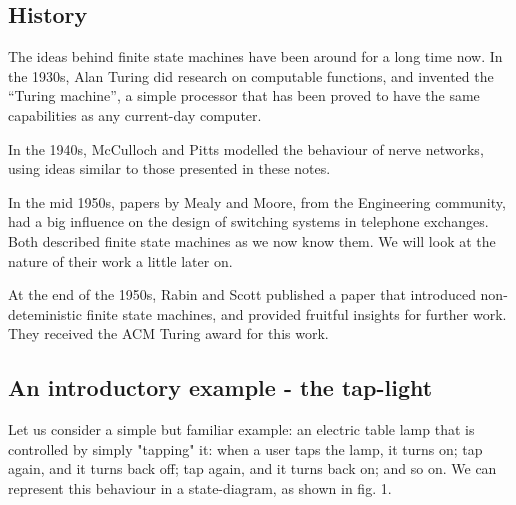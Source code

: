 \documentclass{article}
\begin{document}
\subsection*{History}

The ideas behind finite state machines have been around for a long time now. In the 1930s, Alan Turing did research on computable functions, and invented the “Turing machine”, a simple processor that has been proved to have the same capabilities as any current-day computer.

In the 1940s, McCulloch and Pitts modelled the behaviour of nerve networks, using ideas similar to those presented in these notes.

In the mid 1950s, papers by Mealy and Moore, from the Engineering community, had a big influence on the design of switching systems in telephone exchanges. Both described finite state machines as we now know them. We will look at the nature of their work a little later on.

At the end of the 1950s, Rabin and Scott published a paper that introduced non-deteministic finite state machines, and provided fruitful insights for further work. They received the ACM Turing award for this work.

\subsection*{An introductory example - the tap-light}

Let us consider a simple but familiar example: an electric table lamp that is controlled by simply "tapping" it: when a user taps the lamp, it turns on; tap again, and it turns back off; tap again, and it turns back on; and so on. We can represent this behaviour in a state-diagram, as shown in fig. 1.
\end{document}
